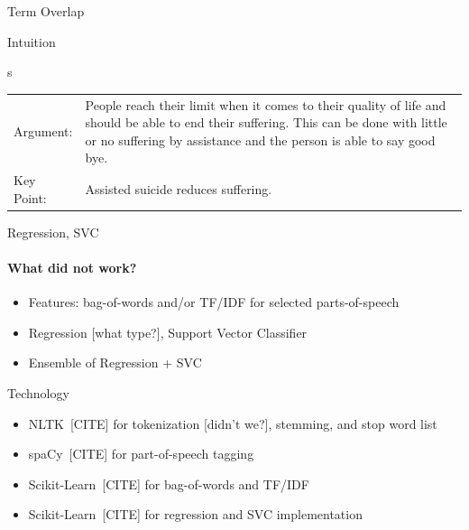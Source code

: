 \documentclass[english,handout]{mlutalk}
\newcommand{\TFIDF}{\mbox{TF/IDF}\xspace}
\newcommand{\todocite}{{\smaller\color{red}[CITE]}\xspace}
\newcommand{\todo}[1]{{\smaller\color{red}[#1]}}
\begin{document}
\begin{frame}[allowframebreaks]{Term Overlap}
\begin{block}{Intuition}
    \begin{example}s
      \smaller
      \begin{tabular}{lp{}}
        Argument: & People reach their limit when it comes to their quality of life and should be able to end their {\color{blue} suffering}. This can be done with little or no {\color{blue} suffering} by {\color{orange} assistance} and the person is able to say good bye. \\
        Key Point: & {\color{orange} Assisted} suicide reduces {\color{blue} suffering}.
      \end{tabular}
    \end{example}
  \end{block}

\end{frame}

\begin{frame}{Regression, SVC}
  
  \framesubtitle{What did not work?}
  
  \begin{itemize}
    \item Features: bag-of-words and/or \TFIDF for selected parts-of-speech
    \item Regression \todo{what type?}, Support Vector Classifier
    \item Ensemble of Regression + SVC
  \end{itemize}
  
  \begin{block}{Technology}
      \begin{itemize}
        \item NLTK~\todocite for tokenization \todo{didn't we?}, stemming,  and stop word list
        \item spaCy~\todocite for part-of-speech tagging
        \item Scikit-Learn~\todocite for bag-of-words and \TFIDF
        \item Scikit-Learn~\todocite for regression and SVC implementation
      \end{itemize}
  \end{block}

\end{frame}
\end{document}
